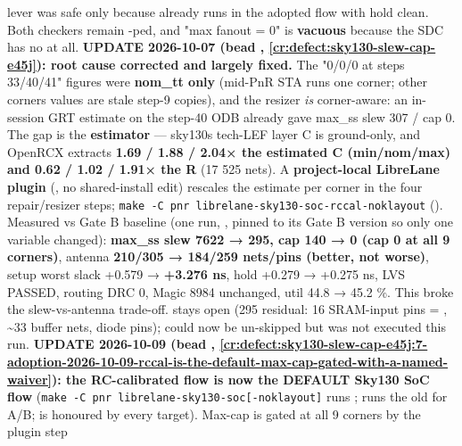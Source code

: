 \begin{record}
\begin{enumerate}
  lever was safe only because  already
  runs in the adopted flow with hold clean. Both checkers remain
  -ped, and "max fanout = 0" is \textbf{vacuous} because
  the SDC has no  at all. \ok{} \textbf{UPDATE
  2026-10-07 (bead , \cref{cr:defect:sky130-slew-cap-e45j}):
  root cause corrected and largely fixed.} The "0/0/0 at steps 33/40/41"
  figures were \textbf{nom\_tt only} (mid-PnR STA runs one corner; other
  corners\textquotesingle{}  values are stale step-9
  copies), and the resizer \emph{is} corner-aware: an in-session GRT
  estimate on the step-40 ODB already gave max\_ss slew 307 / cap 0. The
  gap is the \textbf{estimator} --- sky130\textquotesingle s tech-LEF
  layer C is ground-only, and OpenRCX extracts \textbf{1.69 / 1.88 /
  2.04× the estimated C (min/\allowbreak{}nom/\allowbreak{}max) and 0.62
  / 1.02 / 1.91× the R} (17 525 nets). A \textbf{project-local LibreLane
  plugin} (, no
  shared-install edit) rescales the estimate per corner in the four
  repair/\allowbreak{}resizer steps;
  \texttt{make\ -\allowbreak{}C\ pnr\ librelane-\allowbreak{}sky130-\allowbreak{}soc-\allowbreak{}rccal-\allowbreak{}noklayout}
  (). Measured vs Gate B baseline
   (one run,
  ,  pinned to its
  Gate B version so only one variable changed): \textbf{max\_ss slew
  7622 → 295, cap 140 → 0 (cap 0 at all 9 corners)}, antenna
  \textbf{210/305 → 184/259 nets/pins (better, not worse)}, setup worst
  slack +0.579 → \textbf{+3.276 ns}, hold +0.279 → +0.275 ns, LVS
  PASSED, routing DRC 0, Magic 8984 unchanged, util 44.8 → 45.2 \%. This
  broke the slew-vs-antenna trade-off.  stays open (295
  residual: 16 SRAM-input pins = , \textasciitilde33 buffer
  nets, diode pins);  could now be
  un-skipped but was not executed this run. \ok{} \textbf{UPDATE
  2026-10-09 (bead , \cref{cr:defect:sky130-slew-cap-e45j:7-adoption-2026-10-09-rccal-is-the-default-max-cap-gated-with-a-named-waiver}):
  the RC-calibrated flow is now the DEFAULT Sky130 SoC flow}
  (\texttt{make\ -\allowbreak{}C\ pnr\ librelane-\allowbreak{}sky130-\allowbreak{}soc[-\allowbreak{}noklayout]}
  runs ;  runs the
  old  for A/B;  is honoured
  by every target). Max-cap is gated at all 9 corners by the plugin step

\end{enumerate}
\end{record}
